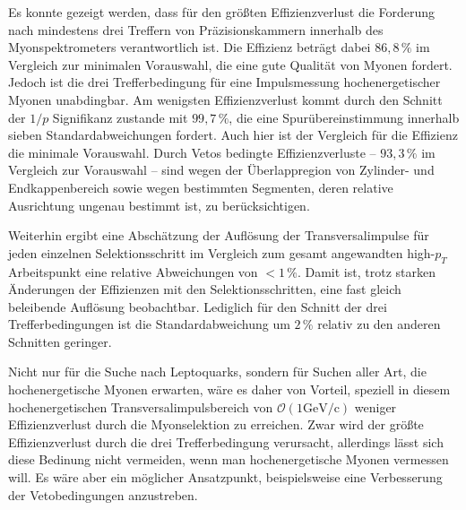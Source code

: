 Es konnte gezeigt werden, dass für den größten Effizienzverlust die Forderung nach mindestens drei Treffern von Präzisionskammern innerhalb des Myonspektrometers verantwortlich ist. Die Effizienz beträgt dabei $86,8\,\%$ im Vergleich zur minimalen Vorauswahl, die eine gute Qualität von Myonen fordert. Jedoch ist die drei Trefferbedingung für eine Impulsmessung hochenergetischer Myonen unabdingbar. Am wenigsten Effizienzverlust kommt durch den Schnitt der $1/p$ Signifikanz zustande mit $99,7\,\%$, die eine Spurübereinstimmung innerhalb sieben Standardabweichungen fordert. Auch hier ist der Vergleich für die Effizienz die minimale Vorauswahl. Durch Vetos bedingte Effizienzverluste -- $93,3\,\%$ im Vergleich zur Vorauswahl -- sind wegen der Überlappregion von Zylinder- und Endkappenbereich sowie wegen be\-stim\-mten Segmenten, deren relative Ausrichtung ungenau bestimmt ist, zu berücksichtigen. 

Weiterhin ergibt eine Abschätzung der Auflösung der Transversalimpulse für jeden einzelnen Selektionsschritt im Vergleich zum gesamt angewandten high-$p_T$ Arbeits\-punkt eine relative Abweichungen von  $<1\,\%$. Damit ist, trotz starken Änderungen der Effizienzen mit den Selektionsschritten, eine fast gleich beleibende Auflösung beobachtbar. Lediglich für den Schnitt der drei Trefferbedingungen ist die Standardabweichung um $2\,\%$ relativ zu den anderen Schnitten geringer. 

Nicht nur für die Suche nach Leptoquarks, sondern für Suchen aller Art, die hochenergetische Myonen erwarten, wäre es daher von Vorteil, speziell in diesem hochenergetischen Transversalimpulsbereich von $\mathcal{O}(1\text{GeV}/\text{c})$ weniger Effizienzverlust durch die Myonselektion zu erreichen. Zwar wird der größte Effizienzverlust durch die drei Trefferbedingung verursacht, allerdings lässt sich diese Bedinung nicht vermeiden, wenn man hochenergetische Myonen vermessen will. Es wäre aber ein möglicher Ansatzpunkt, beispielsweise eine Verbesserung der Vetobedingungen anzustreben.       

%
\appendix%
